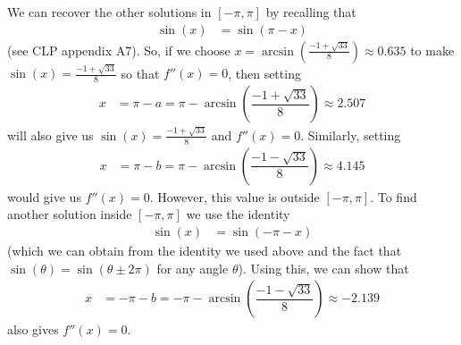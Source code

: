 \begin{solution}
\begin{itemize}
\begin{center}

\end{center}







We can recover the other solutions in $[-\pi,\pi]$ by recalling that
\begin{align*}
  \sin(x) &= \sin(\pi-x)
\end{align*}
(see CLP appendix A7). So, if we choose $x =\arcsin\left(\frac{-1 + \sqrt{33}}{8} \right) \approx 0.635$ to make
$\sin(x)=\frac{-1 + \sqrt{33}}{8}$ so that $f''(x) = 0$, then setting
\begin{align*}
x &= \pi-a=\pi-\arcsin\left(\dfrac{-1 + \sqrt{33}}{8} \right) \approx 2.507
\end{align*}
will also give us $\sin(x)=\frac{-1 + \sqrt{33}}{8}$ and $f''(x) = 0$. Similarly, setting
\begin{align*}
x &=\pi-b= \pi-\arcsin\left(\dfrac{-1 - \sqrt{33}}{8} \right) \approx 4.145
\end{align*}
would give us $f''(x)=0$. However, this value is outside $[-\pi,\pi]$. To find another solution inside $[-\pi,\pi]$ we
use the identity
\begin{align*}
  \sin(x) &= \sin(-\pi-x)
\end{align*}
(which we can obtain from the identity we used above and the fact that $\sin(\theta)=\sin(\theta\pm2\pi)$ for any angle $\theta$). Using this,
we can show that
\begin{align*}
x &=-\pi-b= -\pi-\arcsin\left(\dfrac{-1 - \sqrt{33}}{8} \right) \approx -2.139
\end{align*}
also gives $f''(x)=0$.


\end{itemize}
\end{solution}
